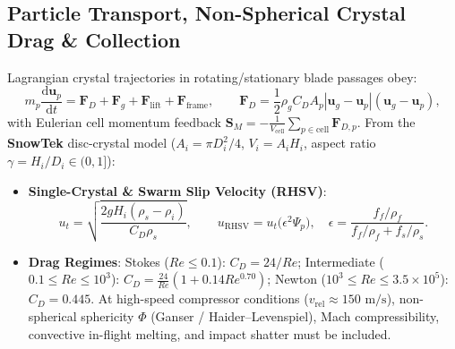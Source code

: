 \documentclass[11pt,a4paper]{article}
\newcommand{\dd}{\mathrm{d}}
\newcommand{\td}[2]{\frac{\dd #1}{\dd #2}}
\begin{document}
\subsection{Particle Transport, Non-Spherical Crystal Drag \& Collection}
Lagrangian crystal trajectories in rotating/stationary blade passages obey:
\begin{equation}
  m_p \td{\mathbf{u}_p}{t} = \mathbf{F}_D + \mathbf{F}_g + \mathbf{F}_{\text{lift}} + \mathbf{F}_{\text{frame}},
  \qquad
  \mathbf{F}_D = \frac{1}{2}\rho_g C_D A_p |\mathbf{u}_g - \mathbf{u}_p|(\mathbf{u}_g - \mathbf{u}_p),
\end{equation}
with Eulerian cell momentum feedback $\mathbf{S}_M = -\frac{1}{V_{\text{cell}}}\sum_{p\in\text{cell}}\mathbf{F}_{D,p}$. From the \textbf{SnowTek} disc-crystal model ($A_i = \pi D_i^2/4$, $V_i = A_i H_i$, aspect ratio $\gamma = H_i/D_i \in (0,1]$):
\begin{itemize}[leftmargin=1.5em,itemsep=2pt]
  \item \textbf{Single-Crystal \& Swarm Slip Velocity (RHSV)}:
  \begin{equation}
    u_t = \sqrt{\frac{2 g H_i (\rho_s - \rho_i)}{C_D \rho_s}},
    \qquad
    u_{\text{RHSV}} = u_t\bigl(\epsilon^2 \Psi_p\bigr),
    \quad \epsilon = \frac{f_f/\rho_f}{f_f/\rho_f + f_s/\rho_s}.
  \end{equation}
  \item \textbf{Drag Regimes}: Stokes ($Re \le 0.1$): $C_D = 24/Re$; Intermediate ($0.1 \le Re \le 10^3$): $C_D = \frac{24}{Re}(1 + 0.14 Re^{0.70})$; Newton ($10^3 \le Re \le 3.5\times 10^5$): $C_D = 0.445$. At high-speed compressor conditions ($v_{\text{rel}} \approx 150\text{ m/s}$), non-spherical sphericity $\Phi$ (Ganser / Haider--Levenspiel), Mach compressibility, convective in-flight melting, and impact shatter must be included.
\end{itemize}
\end{document}
